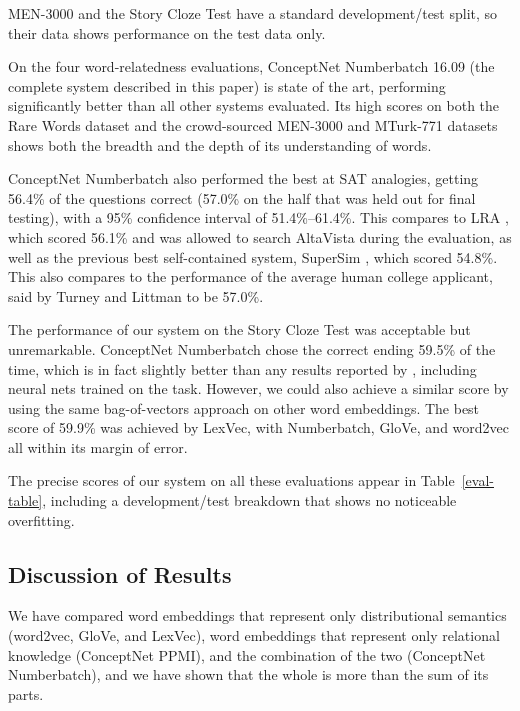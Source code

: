 \documentclass[letterpaper]{article}
\begin{document}
MEN-3000 and the Story Cloze Test have a standard development/test split, so
their data shows performance on the test data only.

On the four word-relatedness evaluations, ConceptNet Numberbatch 16.09 (the
complete system described in this paper) is state of the art, performing
significantly better than all other systems evaluated. Its high scores on both
the Rare Words dataset and the crowd-sourced MEN-3000 and MTurk-771 datasets
shows both the breadth and the depth of its understanding of words.

ConceptNet Numberbatch also performed the best at SAT analogies, getting 56.4\%
of the questions correct (57.0\% on the half that was held out for final
testing), with a 95\% confidence interval of 51.4\%--61.4\%.
This compares to LRA \cite{turney2005lra}, which scored 56.1\% and was
allowed to search AltaVista during the evaluation, as well as the previous best
self-contained system, SuperSim \cite{turney2013supersim}, which scored 54.8\%.
This also compares to the performance of the average human college applicant,
said by Turney and Littman to be 57.0\%.

The performance of our system on the Story Cloze Test was acceptable but
unremarkable.  ConceptNet Numberbatch chose the correct ending 59.5\% of the
time, which is in fact slightly better than any results reported by
\citeauthor{mostafazadeh2016cloze} \citeyear{mostafazadeh2016cloze}, including
neural nets trained on the task. However, we could also achieve a similar score
by using the same bag-of-vectors approach on other word embeddings. The best
score of 59.9\% was achieved by LexVec, with Numberbatch, GloVe, and word2vec
all within its margin of error.

The precise scores of our system on all these evaluations appear in
Table~\ref{eval-table}, including a development/test breakdown that shows no
noticeable overfitting.


\subsection{Discussion of Results}

We have compared word embeddings that represent only distributional semantics
(word2vec, GloVe, and LexVec), word embeddings that represent only relational
knowledge (ConceptNet PPMI), and the combination of the two (ConceptNet
Numberbatch), and we have shown that the whole is more than the sum of its
parts.
\end{document}
